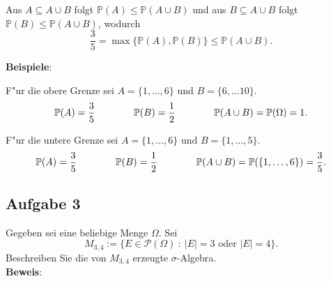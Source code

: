 \documentclass[11pt,a4paper,ngerman]{article}
\newcommand{\set}[1]{ \{ #1 \}}
\newcommand{\Prob}{\mathbb{P}}
\newcommand{\Pot}{\mathcal{P}}
\newcommand{\abs}[1]{ |#1|}
\begin{document}
\begin{enumerate}[(i)]
    Aus $A \subseteq A\cup B$ folgt $\Prob(A) \le \Prob(A\cup B)$ und aus
    $B \subseteq A\cup B$ folgt $\Prob(B) \le \Prob(A\cup B)$, wodurch \[
      \dfrac{3}{5} = \max\set{\Prob(A), \Prob(B)} \le \Prob(A\cup B).
    \]

    \textbf{Beispiele}:

    F"ur die obere Grenze sei $A = \set{1,\ldots,6}$ und
    $B = \set{6, \ldots 10}$. \[
      \Prob(A) = \dfrac{3}{5} \\ \qquad\qquad
      \Prob(B) = \dfrac{1}{2} \\ \qquad\qquad
      \Prob(A\cup B) = \Prob(\Omega) = 1.
    \]

    F"ur die untere Grenze sei $A = \set{1,\ldots,6}$ und
    $B = \set{1,\ldots, 5}$. \[
      \Prob(A) = \dfrac{3}{5} \\ \qquad\qquad
      \Prob(B) = \dfrac{1}{2} \\ \qquad\qquad
      \Prob(A\cup B) = \Prob(\set{1,\ldots,6}) = \dfrac{3}{5}.
    \]
\end{enumerate}

\subsection*{Aufgabe 3}

\newcommand{\SetM}{M_{3,4}}

Gegeben sei eine beliebige Menge $\Omega$. Sei \[
  \SetM := \set{E \in \Pot(\Omega)\ :\ \abs{E} = 3 \mbox{ oder } \abs{E} = 4}.
\]
Beschreiben Sie die von $\SetM$ erzeugte $\sigma$-Algebra.\\

\textbf{Beweis}:
\end{document}
